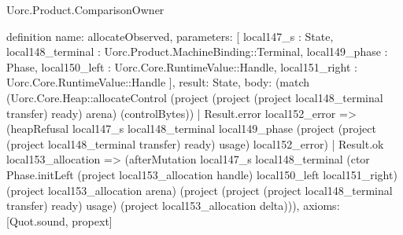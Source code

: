 \begin{lexlean}{Uorc.Product.ComparisonOwner}
\begin{semanticmodule}
definition{
  name: allocateObserved,
  parameters: [
    local147_s : State,
    local148_terminal : Uorc.Product.MachineBinding::Terminal,
    local149_phase : Phase,
    local150_left : Uorc.Core.RuntimeValue::Handle,
    local151_right : Uorc.Core.RuntimeValue::Handle
  ],
  result: State,
  body: (match (Uorc.Core.Heap::allocateControl (project (project (project local148_terminal transfer) ready) arena) (controlBytes))
    | Result.error local152_error => (heapRefusal local147_s local148_terminal local149_phase (project (project (project local148_terminal transfer) ready) usage) local152_error)
    | Result.ok local153_allocation => (afterMutation local147_s local148_terminal (ctor Phase.initLeft (project local153_allocation handle) local150_left local151_right) (project local153_allocation arena) (project (project (project local148_terminal transfer) ready) usage) (project local153_allocation delta))),
  axioms: [Quot.sound, propext]
}


\end{semanticmodule}
\end{lexlean}
